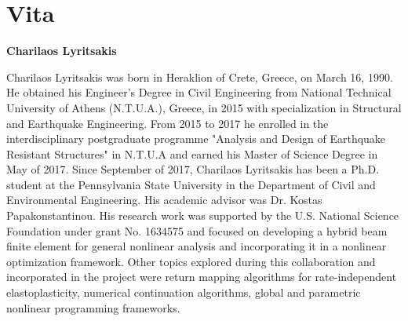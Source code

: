 \chapter*{Vita}
\begin{center}
	\textbf{\large Charilaos Lyritsakis}
\end{center}
Charilaos Lyritsakis was born in Heraklion of Crete, Greece, on March 16, 1990. 
He obtained his Engineer's Degree in Civil Engineering from National Technical 
University of Athens (N.T.U.A.), Greece, in 2015 with specialization in 
Structural and Earthquake Engineering. From 2015 to 2017 he enrolled in the 
interdisciplinary postgraduate programme "Analysis and Design of Earthquake 
Resistant Structures" in N.T.U.A and earned his Master of Science Degree in May 
of 2017. Since September of 2017, Charilaos Lyritsakis has been a Ph.D. student 
at the Pennsylvania State University in the Department of Civil and 
Environmental Engineering. His academic advisor was Dr. Kostas 
Papakonstantinou. His research work was supported by the U.S. National Science 
Foundation under grant No. 1634575 and focused on developing a hybrid beam 
finite element for general nonlinear analysis and incorporating it in a 
nonlinear optimization framework. Other topics explored during this 
collaboration and incorporated in the project were return mapping algorithms 
for rate-independent elastoplasticity, numerical continuation algorithms, 
global and parametric nonlinear programming frameworks.